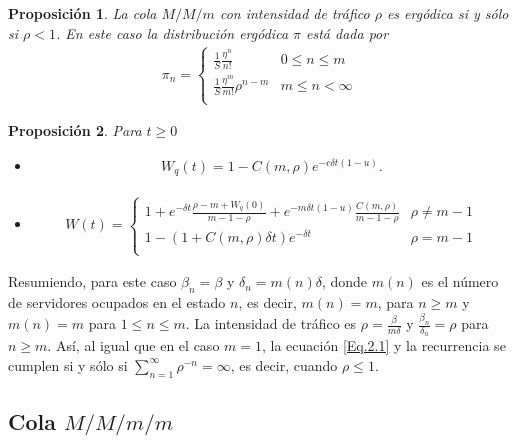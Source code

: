 \documentclass{article}
\newtheorem{Prop}{Proposición}
\begin{document}
\begin{Prop}
La cola $M/M/m$ con intensidad de tr\'afico $\rho$ es erg\'odica si y s\'olo si $\rho<1$. En este caso la distribuci\'on erg\'odica $\pi$ est\'a dada por
\begin{eqnarray}
\pi_{n}=\left\{\begin{array}{cc}
\frac{1}{S}\frac{\eta^{n}}{n!} & 0\leq n\leq m\\
\frac{1}{S}\frac{\eta^{m}}{m!}\rho^{n-m} & m\leq n<\infty\\
\end{array}\right.
\end{eqnarray}
\end{Prop}

\begin{Prop}
Para $t\geq0$
\begin{itemize}
\item[a)]
\begin{eqnarray}
W_{q}\left(t\right)=1-C\left(m,\rho\right)e^{-c\delta
t\left(1-u\right)}.
\end{eqnarray} 
\item[b)]\begin{eqnarray}
W\left(t\right)=\left\{\begin{array}{cc}
1+e^{-\delta t}\frac{\rho-m+W_{q}\left(0\right)}{m-1-\rho}+e^{-m\delta t\left(1-u\right)}\frac{C\left(m,\rho\right)}{m-1-\rho} & \rho\neq m-1\\
1-\left(1+C\left(m,\rho\right)\delta t\right)e^{-\delta t} & \rho=m-1\\
\end{array}\right.
\end{eqnarray}
\end{itemize}
\end{Prop}

Resumiendo, para este caso $\beta_{n}=\beta$ y
$\delta_{n}=m\left(n\right)\delta$, donde $m\left(n\right)$ es el n\'umero de servidores ocupados en el estado $n$, es decir,
$m\left(n\right)=m$, para $n\geq m$ y $m\left(n\right)=m$ para
$1\leq n\leq m$. La intensidad de tr\'afico es
$\rho=\frac{\beta}{m\delta}$ y $\frac{\beta_{n}}{\delta_{n}}=\rho$
para $n\geq m$. As\'i, al igual que en el caso $m=1$, la ecuaci\'on
\ref{Eq.2.1} y la recurrencia se cumplen si y s\'olo si
$\sum_{n=1}^{\infty}\rho^{-n}=\infty$, es decir, cuando
$\rho\leq1$. 


%
\subsection{Cola $M/M/m/m$}
%
\end{document}
